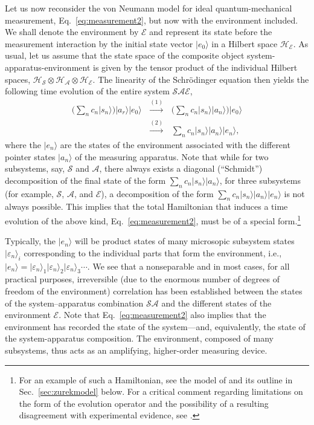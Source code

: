 \documentclass[rmp,aps,amsmath,amsfonts,noshowkeys,noshowpacs,12pt]{revtex4}
\newcommand{\ket}[1]{\ensuremath{|{#1\rangle}}}
\begin{document}
Let us now reconsider the von Neumann model for ideal
quantum-mechanical measurement, Eq.~\eqref{eq:measurement2}, but now
with the environment included. We shall denote the environment by
$\mathcal{E}$ and represent its state before the measurement
interaction by the initial state vector $\ket{e_0}$ in a Hilbert space
$\mathcal{H}_{\mathcal{E}}$. As usual, let us assume that the state
space of the composite object system-apparatus-environment is given
by the tensor product of the individual Hilbert spaces,
$\mathcal{H}_{\mathcal{S}} \otimes \mathcal{H}_{\mathcal{A}} \otimes
\mathcal{H}_{\mathcal{E}}$. The linearity of the Schr\"odinger
equation then yields the following time evolution of the entire system
$\mathcal{SAE}$,
%
\begin{eqnarray} \label{eq:measurement2} 
\bigg( \sum_n c_n \ket{s_n}
\bigg) \ket{a_r}\ket{e_0} 
\, &\stackrel{(1)}{\longrightarrow}& \, \bigg( \sum_n c_n
\ket{s_n} \ket{a_n} \bigg) \ket{e_0} \nonumber \\
\, & \stackrel{(2)}{\longrightarrow} & \, \sum_n c_n \ket{s_n}
\ket{a_n} \ket{e_n}, 
\end{eqnarray}
%
where the $\ket{e_n}$ are the states of the environment associated
with the different pointer states $\ket{a_n}$ of the measuring
apparatus. Note that while for two subsystems, say, $\mathcal{S}$ and
$\mathcal{A}$, there always exists a diagonal (``Schmidt'')
decomposition of the final state of the form $\sum_n c_n \ket{s_n}
\ket{a_n}$, for three subsystems (for example, $\mathcal{S}$,
$\mathcal{A}$, and $\mathcal{E}$), a decomposition of the form $\sum_n
c_n \ket{s_n} \ket{a_n} \ket{e_n}$ is not always possible. This
implies that the total Hamiltonian that induces a time evolution of
the above kind, Eq.~\eqref{eq:measurement2}, must be of a special
form.\footnote{For an example of such a Hamiltonian, see the model of
  \citet{Zurek:1981:dd,Zurek:1982:tv} and its outline in
  Sec.~\ref{sec:zurekmodel} below. For a critical comment regarding
  limitations on the form of the evolution operator and the
  possibility of a resulting disagreement with experimental evidence,
  see \citet{Pessoa:1998:yl}.}

Typically, the $\ket{e_n}$ will be product states of many microsopic
subsystem states $\ket{\varepsilon_n}_i$ corresponding to the
individual parts that form the environment, i.e.,
$\ket{e_n}=\ket{\varepsilon_n}_1 \ket{\varepsilon_n}_2
\ket{\varepsilon_n}_3 \cdots$. We see that a nonseparable and in most
cases, for all practical purposes, irreversible (due to the enormous
number of degrees of freedom of the environment) correlation has been
established between the states of the system--apparatus combination
$\mathcal{SA}$ and the different states of the environment
$\mathcal{E}$. Note that Eq.~\eqref{eq:measurement2} also implies that
the environment has recorded the state of the system---and,
equivalently, the state of the system-apparatus composition. The
environment, composed of many subsystems, thus acts as an amplifying,
higher-order measuring device.
\end{document}
